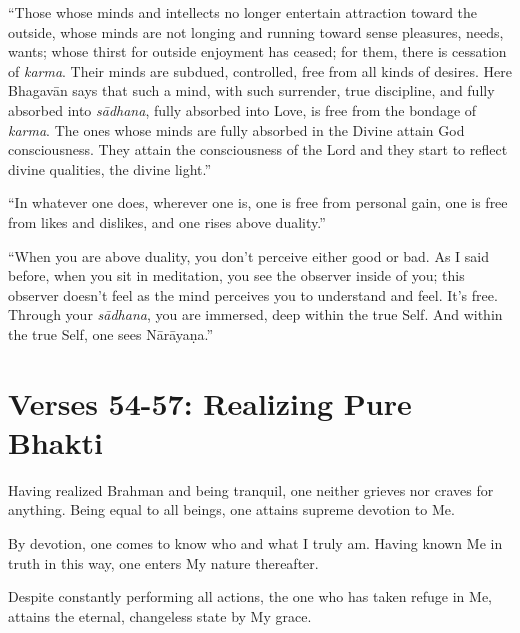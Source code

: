 \enquote{Those whose minds and intellects no longer entertain attraction toward the outside, whose minds are not longing and running toward sense pleasures, needs, wants; whose thirst for outside enjoyment has ceased; for them, there is cessation of \textit{karma}. Their minds are subdued, controlled, free from all kinds of desires. Here Bhagavān says that such a mind, with such surrender, true discipline, and fully absorbed into \textit{sādhana}, fully absorbed into Love, is free from the bondage of \textit{karma}. The ones whose minds are fully absorbed in the Divine attain God consciousness. They attain the consciousness of the Lord and they start to reflect divine qualities, the divine light.}

\enquote{In whatever one does, wherever one is, one is free from personal gain, one is free from likes and dislikes, and one rises above duality.}

\enquote{When you are above duality, you don’t perceive either good or bad. As I said before, when you sit in meditation, you see the observer inside of you; this observer doesn’t feel as the mind perceives you to understand and feel. It’s free. Through your \textit{sādhana}, you are immersed, deep within the true Self. And within the true Self, one sees Nārāyaṇa.}

\section{Verses 54-57: Realizing Pure Bhakti}\label{sec-verses-54-57-realizing-pure-bhakti}

{Having realized Brahman and being tranquil, one neither grieves nor craves for anything. Being equal to all beings, one attains supreme devotion to Me.}

{By devotion, one comes to know who and what I truly am. Having known Me in truth in this way, one enters My nature thereafter.}

{Despite constantly performing all actions, the one who has taken refuge in Me, attains the eternal, changeless state by My grace.}

